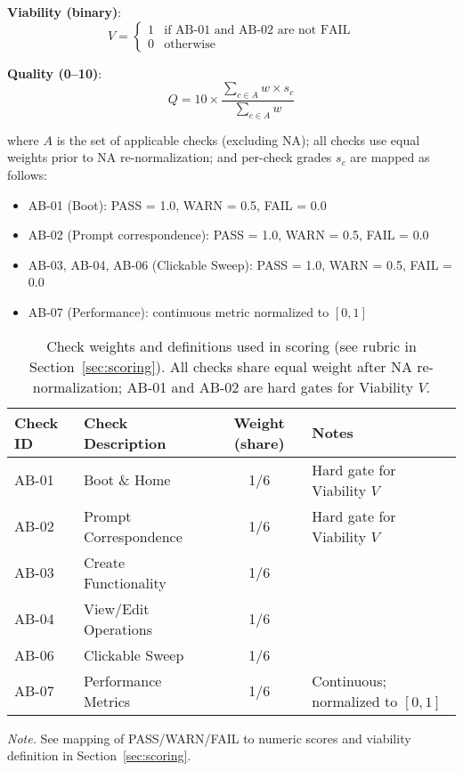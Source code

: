 \documentclass{article}
\begin{document}
\textbf{Viability (binary)}:
\begin{equation}
V = \begin{cases}
1 & \text{if AB-01 and AB-02 are not FAIL} \\
0 & \text{otherwise}
\end{cases}
\end{equation}

\textbf{Quality (0--10)}:
\begin{equation}
Q = 10 \times \frac{\sum_{c \in A} w \times s_c}{\sum_{c \in A} w}
\end{equation}

where $A$ is the set of applicable checks (excluding NA); all checks use equal weights prior to NA re-normalization; and per-check grades $s_c$ are mapped as follows:
\begin{itemize}
\item AB-01 (Boot): PASS = 1.0, WARN = 0.5, FAIL = 0.0
\item AB-02 (Prompt correspondence): PASS = 1.0, WARN = 0.5, FAIL = 0.0
\item AB-03, AB-04, AB-06 (Clickable Sweep): PASS = 1.0, WARN = 0.5, FAIL = 0.0
\item AB-07 (Performance): continuous metric normalized to $[0,1]$
\end{itemize}

\begin{table}[t]
\caption{Check weights and definitions used in scoring (see rubric in Section~\ref{sec:scoring}). All checks share equal weight after NA re-normalization; AB-01 and AB-02 are hard gates for Viability $V$.}
\label{tab:check-weights}
\centering
\begin{threeparttable}
\begin{tabular}{llcl}
\toprule
Check ID & Check Description & Weight (share) & Notes \\
\midrule
AB-01 & Boot \& Home & 1/6 & Hard gate for Viability $V$ \\
AB-02 & Prompt Correspondence & 1/6 & Hard gate for Viability $V$ \\
AB-03 & Create Functionality & 1/6 &  \\
AB-04 & View/Edit Operations & 1/6 &  \\
AB-06 & Clickable Sweep & 1/6 &  \\
AB-07 & Performance Metrics & 1/6 & Continuous; normalized to $[0,1]$ \\
\bottomrule
\end{tabular}
\begin{tablenotes}
\item \textit{Note.} See mapping of PASS/WARN/FAIL to numeric scores and viability definition in Section~\ref{sec:scoring}.
\end{tablenotes}
\end{threeparttable}
\end{table}
\end{document}
